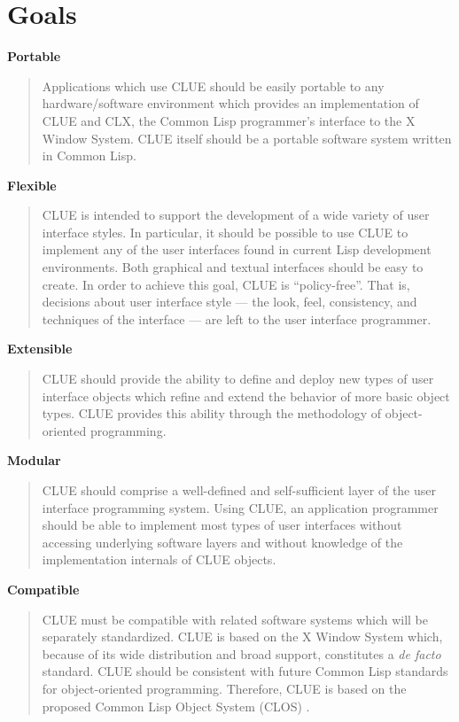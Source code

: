 \section{Goals}
{\bf Portable}
\begin{quote}
Applications which use CLUE should be easily portable to any hardware/software
environment which provides an implementation of CLUE and CLX\cite{clx},
the Common Lisp programmer's interface to the X Window System.  CLUE
itself should be a portable software system written in Common Lisp\cite{cltl}.
\end{quote}
%
{\bf Flexible}
\begin{quote}
CLUE is intended to support the development of a wide variety of user interface
styles. In particular, it should be possible to use CLUE to implement any of the
user interfaces found in current Lisp development environments. Both
graphical and textual interfaces should be easy to create. In order to achieve
this goal, CLUE is
``policy-free''. That is, decisions about user interface style --- the look,
feel, consistency, and techniques of the interface --- are left to the user
interface programmer.
\end{quote}
%
{\bf Extensible}
\begin{quote}
CLUE should provide the ability to define and deploy new types of user
interface objects which refine and extend the behavior of more basic
object types. CLUE provides this ability through the methodology
of object-oriented programming.  
\end{quote} 
%
{\bf Modular}
\begin{quote}
CLUE should comprise a well-defined and self-sufficient layer of the
user interface programming system. Using
CLUE, an
application programmer should be able to implement most types of user
interfaces without accessing underlying software layers and without knowledge of the
implementation internals of CLUE objects.
\end{quote} {\bf Compatible}
\begin{quote}
CLUE must be compatible with related software systems which will be
separately standardized. 
CLUE is based on the X Window System
 which,
because of its wide distribution and broad support, constitutes a {\it de facto}
standard\footnotemark.
CLUE should be consistent with future Common Lisp standards for object-oriented programming.
Therefore, CLUE is based on the proposed Common Lisp Object System
(CLOS)
\cite{clos}.
\end{quote}
%
%
